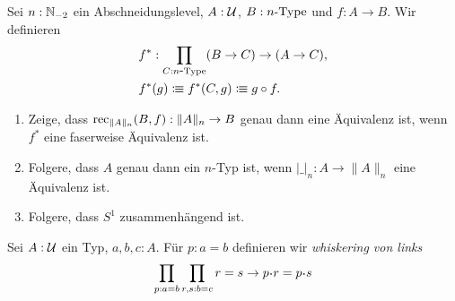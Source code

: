 \documentclass{uebung}
\begin{document}
\begin{exercise}
  Sei $n:\mathbb{N}_{-2}$ ein Abschneidungslevel, $A:\mathcal{U}$, $B:n\mbox{-}\mathrm{Type}$ und $f:A\to B$.
  Wir definieren
  \begin{align*}
    &f^*:\prod_{C:n\mbox{-}\mathrm{Type}}(B \to C) \to (A \to C),\\
    &f^*(g)\vcentcolon\mspace{-1.2mu}\equiv f^*(C,g)\vcentcolon\mspace{-1.2mu}\equiv g\circ f.
  \end{align*}
  \begin{enumerate}
    \item Zeige, dass $\mathrm{rec}_{\|A\|_n}(B,f):\|A\|_n\to B$ genau dann eine Äquivalenz ist, wenn $f^*$ eine faserweise Äquivalenz ist.
    \item Folgere, dass $A$ genau dann ein $n$-Typ ist, wenn $|\_|_n:A\to \|A\|_n$ eine Äquivalenz ist.
    \item Folgere, dass $S^1$ zusammenhängend ist.
  \end{enumerate}
\end{exercise}

\begin{exercise}
  Sei $A:\mathcal{U}$ ein Typ, $a,b,c:A$.
  Für $p:a=b$ definieren wir \emph{whiskering von links}
  \begin{align*}
    \prod_{p:a=b}\prod_{r,s:b=c}r=s\to p\kon r=p\kon s\\
  \end{align*}
\end{exercise}
\end{document}

